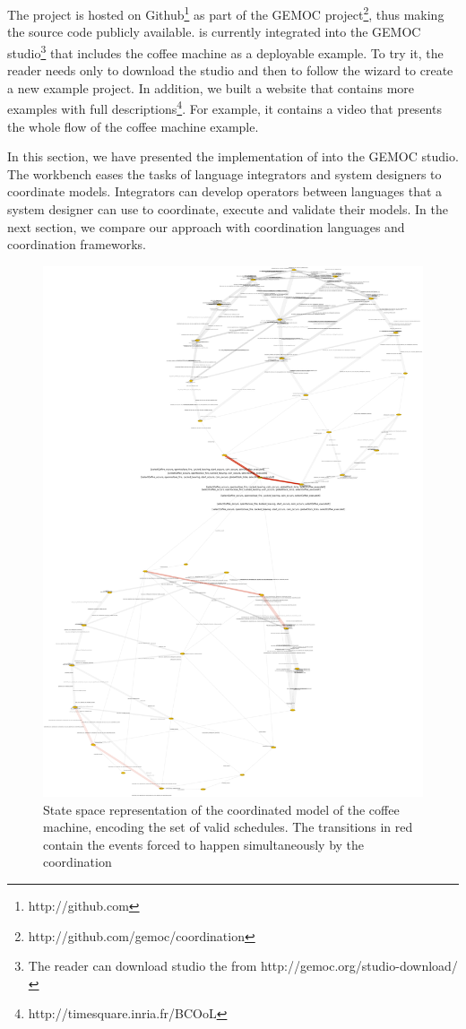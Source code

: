 The project \bcool is hosted on Github\footnote{http://github.com} as part of the GEMOC project\footnote{http://github.com/gemoc/coordination}, thus making the source code publicly available. \bcool is currently integrated into the GEMOC studio\footnote{The reader can download studio the from http://gemoc.org/studio-download/} that includes the coffee machine as a deployable example. To try it, the reader needs only to download the studio and then to follow the wizard to create a new example project. In addition, we built a website that contains more examples with full descriptions\footnote{http://timesquare.inria.fr/BCOoL}. For example, it contains a video that presents the whole flow of the coffee machine example.

In this section, we have presented the implementation of \bcool into the GEMOC studio. The workbench eases the tasks of language integrators and system designers to coordinate models. Integrators can develop operators between languages that a system designer can use to coordinate, execute and validate their models. In the next section, we compare our approach with coordination languages and coordination frameworks.  

\begin{figure}[]
	\begin{center}
		\includegraphics[width=.8\textwidth]{bcool/figs/statespace}
		\caption{State space representation of the coordinated model of the coffee machine, encoding the set of valid schedules. The transitions in red contain the events forced to happen simultaneously by the coordination}
		\label{fig:statespace}
	\end{center}
\end{figure}

